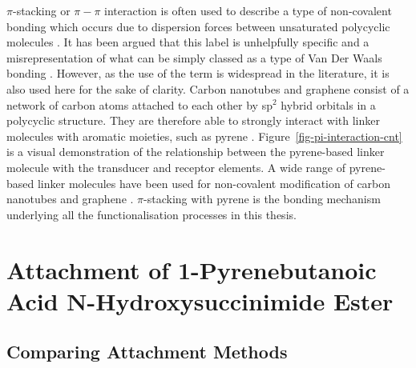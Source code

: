 \documentclass[
  a4paper,
]{scrbook}
\begin{document}
\(\pi\)-stacking or \(\pi-\pi\) interaction is often used to describe a
type of non-covalent bonding which occurs due to dispersion forces
between unsaturated polycyclic molecules \autocite{Perez2015}. It has
been argued that this label is unhelpfully specific and a
misrepresentation of what can be simply classed as a type of Van Der
Waals bonding \autocite{Martinez2012,Perez2015}. However, as the use of
the term is widespread in the literature, it is also used here for the
sake of clarity. Carbon nanotubes and graphene consist of a network of
carbon atoms attached to each other by sp\(^{2}\) hybrid orbitals in a
polycyclic structure. They are therefore able to strongly interact with
linker molecules with aromatic moieties, such as pyrene
\autocite{Hermanson2013-16,Perez2015,Mishyn2022}.
Figure~\ref{fig-pi-interaction-cnt} is a visual demonstration of the
relationship between the pyrene-based linker molecule with the
transducer and receptor elements. A wide range of pyrene-based linker
molecules have been used for non-covalent modification of carbon
nanotubes and graphene \autocite{Zhou2019}. \(\pi\)-stacking with pyrene
is the bonding mechanism underlying all the functionalisation processes
in this thesis.

\hypertarget{sec-PBASE}{%
\section{Attachment of 1-Pyrenebutanoic Acid N-Hydroxysuccinimide
Ester}\label{sec-PBASE}}

\hypertarget{comparing-attachment-methods}{%
\subsection{Comparing Attachment
Methods}\label{comparing-attachment-methods}}
\end{document}
